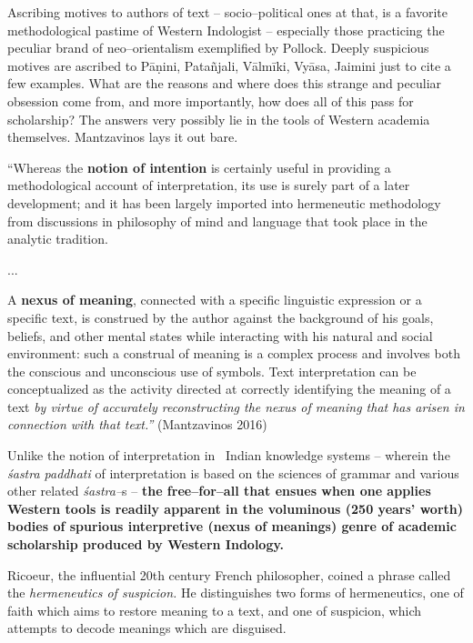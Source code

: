 Ascribing motives to authors of text – socio–political ones at that, is a favorite methodological pastime of Western Indologist – especially those practicing the peculiar brand of neo–orientalism exemplified by Pollock. Deeply suspicious motives are ascribed to Pāṇini, Patañjali, Vālmīki, Vyāsa, Jaimini just to cite a few examples. What are the reasons and where does this strange and peculiar obsession come from, and more importantly, how does all of this pass for scholarship? The answers very possibly lie in the tools of Western academia themselves. Mantzavinos lays it out bare.

\begin{myquote}
“Whereas the \textbf{notion of intention} is certainly useful in providing a methodological account of interpretation, its use is surely part of a later development; and it has been largely imported into hermeneutic methodology from discussions in philosophy of mind and language that took place in the analytic tradition.
\end{myquote}

\begin{myquote}
...
\end{myquote}

\begin{myquote}
A \textbf{nexus of meaning}, connected with a specific linguistic expression or a specific text, is construed by the author against the background of his goals, beliefs, and other mental states while interacting with his natural and social environment: such a construal of meaning is a complex process and involves both the conscious and unconscious use of symbols. Text interpretation can be conceptualized as the activity directed at correctly identifying the meaning of a text \textit{by virtue of accurately reconstructing the nexus of meaning that has arisen in connection with that text.” }\hfill (Mantzavinos 2016)
\end{myquote}

Unlike the notion of interpretation in  Indian knowledge systems – wherein the \textit{śastra paddhati} of interpretation is based on the sciences of grammar and various other related \textit{śastra–}s – \textbf{the free–for–all that ensues when one applies Western tools is readily apparent in the voluminous (250 years’ worth) bodies of spurious interpretive (nexus of meanings) genre of academic scholarship produced by Western Indology.}

Ricoeur, the influential 20th century French philosopher, coined a phrase called the \textit{hermeneutics of suspicion.} He distinguishes two forms of hermeneutics, one of faith which aims to restore meaning to a text, and one of suspicion, which attempts to decode meanings which are disguised.

